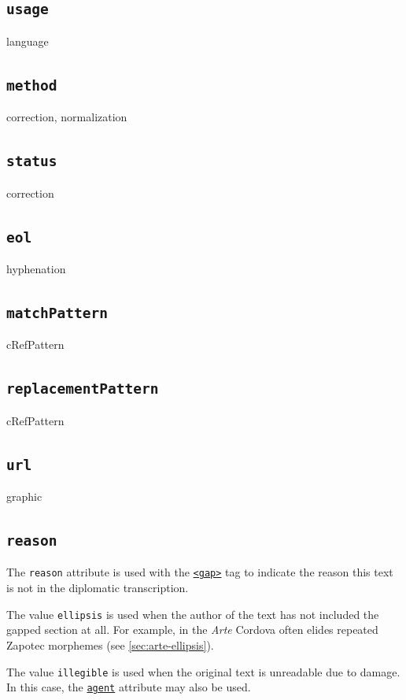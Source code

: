 \documentclass[12pt,a4paper]{article}
\begin{document}
\subsection{\texttt{usage}} \label{att-sec:usage}
language

\subsection{\texttt{method}} \label{att-sec:method}
correction, normalization

\subsection{\texttt{status}} \label{att-sec:status}
correction

\subsection{\texttt{eol}} \label{att-sec:eol}
hyphenation

\subsection{\texttt{matchPattern}} \label{att-sec:matchPattern}
cRefPattern

\subsection{\texttt{replacementPattern}} \label{att-sec:replacementPattern}
cRefPattern

\subsection{\texttt{url}} \label{att-sec:url}
graphic

\subsection{\texttt{reason}} \label{att-sec:reason}
The \texttt{reason} attribute is used with the \hyperref[tag-sec:gap]{\texttt{<gap>}} tag to indicate the reason this text is not in the diplomatic transcription.

The value \texttt{ellipsis} is used when the author of the text has not included the gapped section at all.  For example, in the \emph{Arte} Cordova often elides repeated Zapotec morphemes (see \hyperref[sec:arte-ellipsis]{\ref{sec:arte-ellipsis}}).

The value \texttt{illegible} is used when the original text is unreadable due to damage.  In this case, the \hyperref[att-sec:agent]{\texttt{agent}} attribute may also be used.
\end{document}
